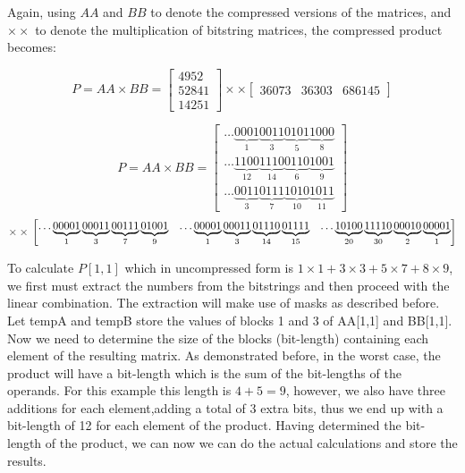 \documentclass[12pt]{article}
\begin{document}
Again, using $AA$ and $BB$ to denote the compressed versions of the matrices,
and $\times\times$ to denote the multiplication of bitstring matrices, the
compressed product becomes:

\begin{equation}\label{eq:prodbs}
	P = AA \times BB = \begin{bmatrix}
			4952\\ 
			52841\\ 
			14251
		\end{bmatrix} 
        \times\times
        \begin{bmatrix}
			36073 & 36303 & 686145
		\end{bmatrix}
\end{equation}


\begin{equation}
	P = AA \times BB = 
    	\begin{bmatrix}

\ldots\underbrace{0001}_{1}\underbrace{0011}_{3}\underbrace{0101}_{5}\underbrace
{1000}_{8}\\

\ldots\underbrace{1100}_{12}\underbrace{1110}_{14}\underbrace{0110}_{6}
\underbrace{1001}_{9}\\ 

\ldots\underbrace{0011}_{3}\underbrace{0111}_{7}\underbrace{1010}_{10}
\underbrace{1011}_{11}
		\end{bmatrix}
\end{equation}
\begin{equation}
        \times\times \\
        \begin{bmatrix}

\ldots\underbrace{00001}_{1}\underbrace{00011}_{3}\underbrace{00111}_{7}
\underbrace{01001}_{9}  &

\ldots\underbrace{00001}_{1}\underbrace{00011}_{3}\underbrace{01110}_{14}
\underbrace{01111}_{15} & 	

\ldots\underbrace{10100}_{20}\underbrace{11110}_{30}\underbrace{00010}_{2}
\underbrace{00001}_{1}
		\end{bmatrix}
\end{equation}

To calculate $P[1,1]$ which in uncompressed form is $1 \times 1 + 3 \times 3 + 5
\times 7 + 8 \times 9$, we first must extract the numbers from the bitstrings
and then proceed with the linear combination. The extraction will make use of
masks as described before. Let tempA and tempB store the values of blocks 1 and
3 of AA[1,1] and BB[1,1]. Now we need to determine the size of the blocks
(bit-length) containing each element of the resulting matrix. As demonstrated
before, in the worst case, the product will have a bit-length which is the sum
of the bit-lengths of the operands. For this example this length is $4+5=9$,
however, we also have three additions for each element,adding a total of 3
extra bits, thus we end up with a bit-length of 12 for each element of the
product. Having determined the bit-length of the product, we can now we can do
the actual calculations and store the results.
\end{document}
